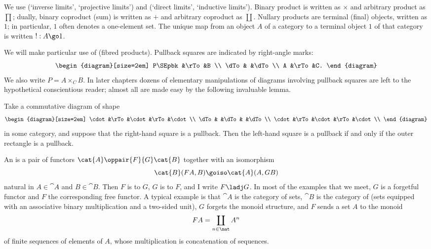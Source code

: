 We use %
%
%
(`inverse limits', `projective limits') and
%
%
%
(`direct limits', `inductive limits').  Binary product%
%
%
is
written as $\times$%
% 
%
and arbitrary product as $\prod$;%
% 
%
dually, binary
coproduct%
%
%
(sum)%
%
%
is written as $+$%
% 
%
and arbitrary coproduct as $\coprod$.%
% 
%
Nullary products are terminal%
%
%
(final)%
%
%
objects, written as $1$;%
% 
%
in
particular, $1$ often denotes a one-element set.  The unique map from an
object $A$ of a category to a terminal object $1$ of that category is
written $!: A \go 1$.%
% 
%

We will make particular use of %
%
%
(fibred%
%
%
products).
Pullback squares are indicated by right-angle marks:%
% 
%
\[
\begin{diagram}[size=2em]
P\SEpbk		&\rTo	&B	\\
\dTo		&	&\dTo	\\
A		&\rTo	&C.	
\end{diagram}
\]
We also write $P = A \times_C B$.%
% 
%
In later chapters dozens of elementary
manipulations of diagrams involving pullback squares are left to the
hypothetical conscientious reader; almost all are made easy by the
following invaluable lemma.
%
\begin{lemma} 
Take a commutative diagram of shape
\[
\begin{diagram}[size=2em]
\cdot	&\rTo	&\cdot	&\rTo	&\cdot	\\
\dTo	&	&\dTo	&	&\dTo	\\
\cdot	&\rTo	&\cdot	&\rTo	&\cdot	\\
\end{diagram}
\]
in some category, and suppose that the right-hand square is a pullback.
Then the left-hand square is a pullback if and only if the outer rectangle
is a pullback.
\done
\end{lemma}

An %
%
%
is a pair of functors $\cat{A} \oppair{F}{G} \cat{B}$
together with an isomorphism
%
\begin{equation}	\label{eq:adjn}
\cat{B}(FA, B) \goiso \cat{A}(A, GB)
\end{equation}
%
natural in $A \in \cat{A}$ and $B\in \cat{B}$.  Then $F$ is  to $G$, $G$ is  to $F$, and I write $F\ladj
G$.%
% 
%
In most of the examples that we meet, $G$ is a forgetful functor and
$F$ the corresponding free functor.  A typical example is that $\cat{A}$ is
the category of sets, $\cat{B}$ is the category of %
%
%
(sets
equipped with an associative binary multiplication and a two-sided unit),
$G$ forgets the monoid structure, and $F$ sends a set $A$ to the monoid%
%
%
\[
FA = \coprod_{n\in\nat} A^n
\]
of finite sequences of elements of $A$, whose multiplication is
concatenation of sequences. 

